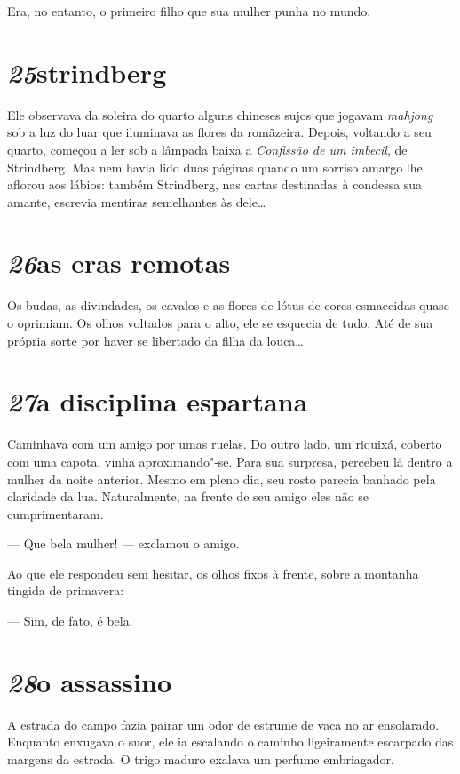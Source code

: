 Era, no entanto, o primeiro filho que sua mulher punha no mundo.

\section*{\textit{25}\es strindberg}

Ele observava da soleira do quarto alguns chineses sujos que jogavam
\textit{mahjong} sob a luz do luar que iluminava as flores da
romãzeira. Depois, voltando a seu quarto, começou a ler sob a lâmpada
baixa a \textit{Confissão de um imbecil}, de Strindberg. Mas nem havia
lido duas páginas quando um sorriso amargo lhe aflorou aos lábios:
também Strindberg, nas cartas destinadas à condessa sua amante,
escrevia mentiras semelhantes às dele\ldots{}

\section*{\textit{26}\es as eras remotas}

Os budas, as divindades, os cavalos e as flores de lótus de cores
esmaecidas quase o oprimiam. Os olhos voltados para o alto, ele se
esquecia de tudo. Até de sua própria sorte por haver se libertado da
filha da louca\ldots{}

\section*{\textit{27}\es a disciplina espartana}

Caminhava com um amigo por umas ruelas. Do outro lado, um riquixá,
coberto com uma capota, vinha aproximando"-se. Para sua surpresa,
percebeu lá dentro a mulher da noite anterior. Mesmo em pleno dia, seu
rosto parecia banhado pela claridade da lua.  Naturalmente, na frente
de seu amigo eles não se cumprimentaram.

--- Que bela mulher! --- exclamou o amigo.

Ao que ele respondeu sem hesitar, os olhos fixos à frente, sobre a
montanha tingida de primavera:

--- Sim, de fato, é bela.

\section*{\textit{28}\es o assassino}

A estrada do campo fazia pairar um odor de estrume de vaca no ar
ensolarado. Enquanto enxugava o suor, ele ia escalando o caminho
ligeiramente escarpado das margens da estrada. O trigo maduro exalava
um perfume embriagador.

